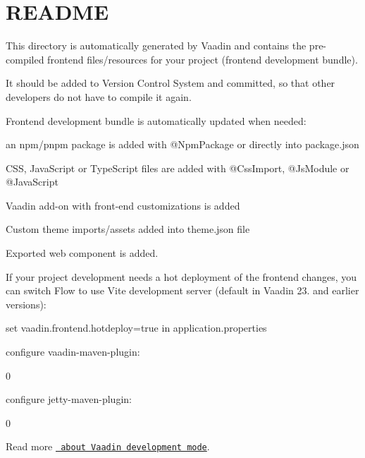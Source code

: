 \chapter{README}
\hypertarget{md_src_2main_2bundles_2_r_e_a_d_m_e}{}\label{md_src_2main_2bundles_2_r_e_a_d_m_e}
This directory is automatically generated by Vaadin and contains the pre-\/compiled frontend files/resources for your project (frontend development bundle).

It should be added to Version Control System and committed, so that other developers do not have to compile it again.

Frontend development bundle is automatically updated when needed\+:
\begin{DoxyItemize}
\item an npm/pnpm package is added with @\+Npm\+Package or directly into package.\+json
\item CSS, Java\+Script or Type\+Script files are added with @\+Css\+Import, @\+Js\+Module or @\+Java\+Script
\item Vaadin add-\/on with front-\/end customizations is added
\item Custom theme imports/assets added into \textquotesingle{}theme.\+json\textquotesingle{} file
\item Exported web component is added.
\end{DoxyItemize}

If your project development needs a hot deployment of the frontend changes, you can switch Flow to use Vite development server (default in Vaadin 23. and earlier versions)\+:
\begin{DoxyItemize}
\item set {\ttfamily vaadin.\+frontend.\+hotdeploy=true} in {\ttfamily application.\+properties}
\item configure {\ttfamily vaadin-\/maven-\/plugin}\+: 
\begin{DoxyCode}{0}

\end{DoxyCode}

\item configure {\ttfamily jetty-\/maven-\/plugin}\+: 
\begin{DoxyCode}{0}

\end{DoxyCode}

\end{DoxyItemize}

Read more \href{https://vaadin.com/docs/next/configuration/development-mode/\#pre-compiled-front-end-bundle-for-faster-start-up}{\texttt{ about Vaadin development mode}}. 